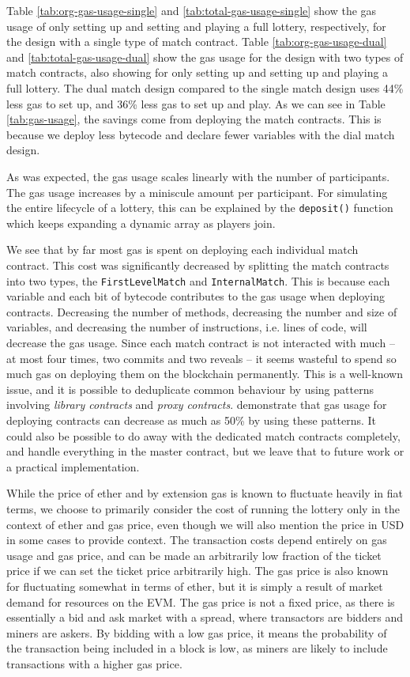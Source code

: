\noindent
Table \ref{tab:org-gas-usage-single} and \ref{tab:total-gas-usage-single} show the gas usage of only setting up and setting and playing a full lottery, respectively, for the design with a single type of match contract. Table \ref{tab:org-gas-usage-dual} and \ref{tab:total-gas-usage-dual} show the gas usage for the design with two types of match contracts, also showing for only setting up and setting up and playing a full lottery.
The dual match design compared to the single match design uses 44\% less gas to set up, and 36\% less gas to set up and play. As we can see in Table \ref{tab:gas-usage}, the savings come from deploying the match contracts. This is because we deploy less bytecode and declare fewer variables with the dial match design.

As was expected, the gas usage scales linearly with the number of participants. The gas usage increases by a miniscule amount per participant. For simulating the entire lifecycle of a lottery, this can be explained by the \texttt{deposit()} function which keeps expanding a dynamic array as players join. 

We see that by far most gas is spent on deploying each individual match contract. This cost was significantly decreased by splitting the match contracts into two types, the \texttt{FirstLevelMatch} and \texttt{InternalMatch}. This is because each variable and each bit of bytecode contributes to the gas usage when deploying contracts. Decreasing the number of methods, decreasing the number and size of variables, and decreasing the number of instructions, i.e. lines of code, will decrease the gas usage. Since each match contract is not interacted with much – at most four times, two commits and two reveals – it seems wasteful to spend so much gas on deploying them on the blockchain permanently. This is a well-known issue, and it is possible to deduplicate common behaviour by using patterns involving \emph{library contracts} and \emph{proxy contracts}. \cite{lu_solidity_2018} demonstrate that gas usage for deploying contracts can decrease as much as 50\% by using these patterns. It could also be possible to do away with the dedicated match contracts completely, and handle everything in the master contract, but we leave that to future work or a practical implementation.

While the price of ether and by extension gas is known to fluctuate heavily in fiat terms, we choose to primarily consider the cost of running the lottery only in the context of ether and gas price, even though we will also mention the price in USD in some cases to provide context. The transaction costs depend entirely on gas usage and gas price, and can be made an arbitrarily low fraction of the ticket price if we can set the ticket price arbitrarily high. The gas price is also known for fluctuating somewhat in terms of ether, but it is simply a result of market demand for resources on the EVM. The gas price is not a fixed price, as there is essentially a bid and ask market with a spread, where transactors are bidders and miners are askers. By bidding with a low gas price, it means the probability of the transaction being included in a block is low, as miners are likely to include transactions with a higher gas price.
